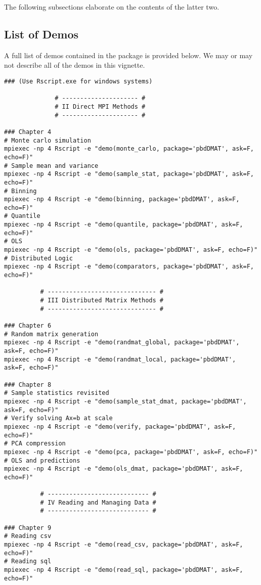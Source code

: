 The following subsections elaborate on the contents of the latter two.


\subsection{List of Demos}
\label{sec:demolist}

A full list of demos contained in the  package is provided below.
We may or may not describe all of the demos in this vignette.

\begin{lstlisting}[title=List of Demos]
### (Use Rscript.exe for windows systems)

		      # --------------------- #
		      # II Direct MPI Methods #
		      # --------------------- #

### Chapter 4
# Monte carlo simulation
mpiexec -np 4 Rscript -e "demo(monte_carlo, package='pbdDMAT', ask=F, echo=F)"
# Sample mean and variance
mpiexec -np 4 Rscript -e "demo(sample_stat, package='pbdDMAT', ask=F, echo=F)"
# Binning
mpiexec -np 4 Rscript -e "demo(binning, package='pbdDMAT', ask=F, echo=F)"
# Quantile
mpiexec -np 4 Rscript -e "demo(quantile, package='pbdDMAT', ask=F, echo=F)"
# OLS
mpiexec -np 4 Rscript -e "demo(ols, package='pbdDMAT', ask=F, echo=F)"
# Distributed Logic
mpiexec -np 4 Rscript -e "demo(comparators, package='pbdDMAT', ask=F, echo=F)"

		  # ------------------------------ #
		  # III Distributed Matrix Methods #
		  # ------------------------------ #

### Chapter 6
# Random matrix generation
mpiexec -np 4 Rscript -e "demo(randmat_global, package='pbdDMAT', ask=F, echo=F)"
mpiexec -np 4 Rscript -e "demo(randmat_local, package='pbdDMAT', ask=F, echo=F)"

### Chapter 8
# Sample statistics revisited
mpiexec -np 4 Rscript -e "demo(sample_stat_dmat, package='pbdDMAT', ask=F, echo=F)"
# Verify solving Ax=b at scale
mpiexec -np 4 Rscript -e "demo(verify, package='pbdDMAT', ask=F, echo=F)"
# PCA compression
mpiexec -np 4 Rscript -e "demo(pca, package='pbdDMAT', ask=F, echo=F)"
# OLS and predictions
mpiexec -np 4 Rscript -e "demo(ols_dmat, package='pbdDMAT', ask=F, echo=F)"

		  # ---------------------------- #
		  # IV Reading and Managing Data #
		  # ---------------------------- #

### Chapter 9
# Reading csv
mpiexec -np 4 Rscript -e "demo(read_csv, package='pbdDMAT', ask=F, echo=F)"
# Reading sql
mpiexec -np 4 Rscript -e "demo(read_sql, package='pbdDMAT', ask=F, echo=F)"


\end{lstlisting}
